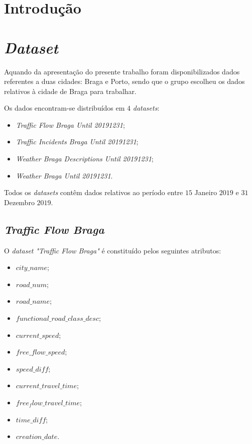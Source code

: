 \documentclass[a4paper, 12pt]{article}
\begin{document}
\newpage
\newpage
\tableofcontents
\thispagestyle{empty}

\newpage
{}

\section{Introdução}


\newpage

\section{\textit{Dataset}}

Aquando da apresentação do presente trabalho foram disponibilizados dados referentes a duas cidades: Braga e Porto, sendo que o grupo escolheu os dados relativos à cidade de Braga para trabalhar.

Os dados encontram-se distribuídos em $4$ \textit{datasets}:

\begin{itemize}
	\item \textit{Traffic Flow Braga Until 20191231};
	\item \textit{Traffic Incidents Braga Until 20191231};
	\item \textit{Weather Braga Descriptions Until 20191231};
	\item \textit{Weather Braga Until 20191231}.
\end{itemize}

Todos os \textit{datasets} contêm dados relativos ao período entre $15$ Janeiro $2019$ e $31$ Dezembro $2019$.

\subsection{\textit{Traffic Flow Braga}}

O \textit{dataset "Traffic Flow Braga" } é constituído pelos seguintes atributos:

\begin{itemize}
	\item $city\_name$;
	\item $road\_num$;
	\item $road\_name$;
	\item $functional\_road\_class\_desc$;
	\item $current\_speed$;
	\item $free\_flow\_speed$;
	\item $speed\_diff$;
	\item $current\_travel\_time$;
	\item $free_flow\_travel\_time$;
	\item $time\_diff$;
	\item $creation\_date$.
\end{itemize}
\end{document}
